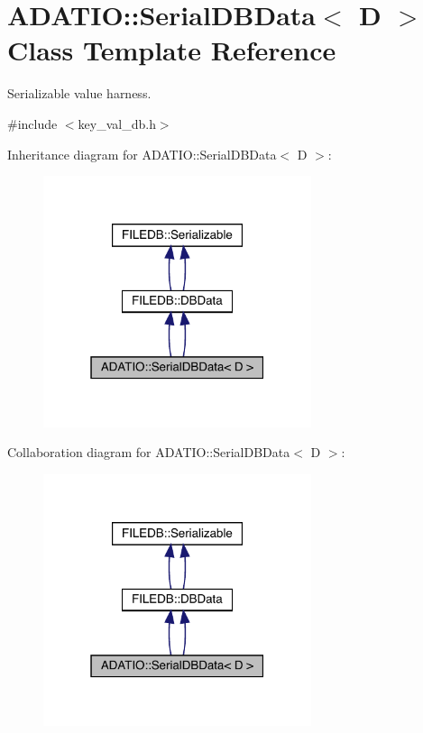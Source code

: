 \hypertarget{classADATIO_1_1SerialDBData}{}\section{A\+D\+A\+T\+IO\+:\+:Serial\+D\+B\+Data$<$ D $>$ Class Template Reference}
\label{classADATIO_1_1SerialDBData}


Serializable value harness.  




{\ttfamily \#include $<$key\+\_\+val\+\_\+db.\+h$>$}



Inheritance diagram for A\+D\+A\+T\+IO\+:\+:Serial\+D\+B\+Data$<$ D $>$\+:\nopagebreak
\begin{figure}[H]
\begin{center}
\leavevmode
\includegraphics[width=223pt]{d1/dc6/classADATIO_1_1SerialDBData__inherit__graph}
\end{center}
\end{figure}


Collaboration diagram for A\+D\+A\+T\+IO\+:\+:Serial\+D\+B\+Data$<$ D $>$\+:\nopagebreak
\begin{figure}[H]
\begin{center}
\leavevmode
\includegraphics[width=223pt]{db/d16/classADATIO_1_1SerialDBData__coll__graph}
\end{center}
\end{figure}
